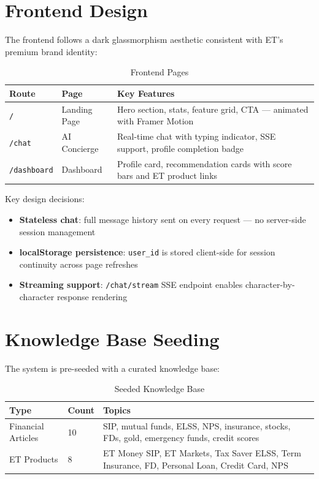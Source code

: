 \documentclass[12pt,a4paper]{article}
\begin{document}
\section{Frontend Design}

The frontend follows a dark glassmorphism aesthetic consistent with ET's premium brand identity:

\begin{table}[H]
\centering
\caption{Frontend Pages}
\begin{tabularx}{\textwidth}{llX}
\toprule
\textbf{Route} & \textbf{Page} & \textbf{Key Features} \\
\midrule
\texttt{/} & Landing Page & Hero section, stats, feature grid, CTA — animated with Framer Motion \\
\texttt{/chat} & AI Concierge & Real-time chat with typing indicator, SSE support, profile completion badge \\
\texttt{/dashboard} & Dashboard & Profile card, recommendation cards with score bars and ET product links \\
\bottomrule
\end{tabularx}
\end{table}

Key design decisions:
\begin{itemize}[noitemsep]
  \item \textbf{Stateless chat}: full message history sent on every request — no server-side session management
  \item \textbf{localStorage persistence}: \texttt{user\_id} is stored client-side for session continuity across page refreshes
  \item \textbf{Streaming support}: \texttt{/chat/stream} SSE endpoint enables character-by-character response rendering
\end{itemize}

\section{Knowledge Base Seeding}

The system is pre-seeded with a curated knowledge base:

\begin{table}[H]
\centering
\caption{Seeded Knowledge Base}
\begin{tabularx}{\textwidth}{llX}
\toprule
\textbf{Type} & \textbf{Count} & \textbf{Topics} \\
\midrule
Financial Articles & 10 & SIP, mutual funds, ELSS, NPS, insurance, stocks, FDs, gold, emergency funds, credit scores \\
ET Products & 8 & ET Money SIP, ET Markets, Tax Saver ELSS, Term Insurance, FD, Personal Loan, Credit Card, NPS \\
\bottomrule
\end{tabularx}
\end{table}
\end{document}
